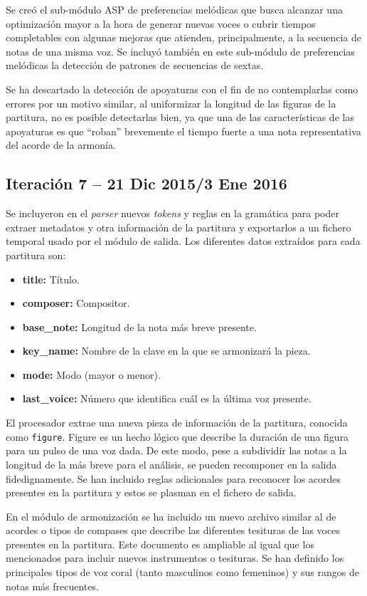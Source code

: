 Se creó el sub-módulo ASP de preferencias melódicas que busca alcanzar una optimización mayor a la hora de generar nuevas voces o cubrir tiempos completables con algunas mejoras que atienden, principalmente, a la secuencia de notas de una misma voz. Se incluyó también en este sub-módulo de preferencias melódicas la detección de patrones de secuencias de sextas.

Se ha descartado la detección de apoyaturas con el fin de no contemplarlas como errores por un motivo similar, al uniformizar la longitud de las figuras de la partitura, no es posible detectarlas bien, ya que una de las características de las apoyaturas es que ``roban'' brevemente el tiempo fuerte a una nota representativa del acorde de la armonía.

\subsection{Iteración 7 -- 21 Dic 2015/3 Ene 2016}
\label{subsec:seventh_iteration}

Se incluyeron en el \textit{parser} nuevos \textit{tokens} y reglas en la gramática para poder extraer metadatos y otra información de la partitura y exportarlos a un fichero temporal usado por el módulo de salida. Los diferentes datos extraídos para cada partitura son:
\begin{itemize}
	\item \textbf{title:} Título.
	\item \textbf{composer:} Compositor.
	\item \textbf{base\_note:} Longitud de la nota más breve presente.
	\item \textbf{key\_name:} Nombre de la clave en la que se armonizará la pieza.
	\item \textbf{mode:} Modo (mayor o menor).
	\item \textbf{last\_voice:} Número que identifica cuál es la última voz presente.
\end{itemize}

El procesador extrae una nueva pieza de información de la partitura, conocida como \texttt{figure}. Figure es un hecho lógico que describe la duración de una figura para un pulso de una voz dada. De este modo, pese a subdividir las notas a la longitud de la más breve para el análisis, se pueden recomponer en la salida fidedignamente. Se han incluido reglas adicionales para reconocer los acordes presentes en la partitura y estos se plasman en el fichero de salida.

En el módulo de armonización se ha incluido un nuevo archivo similar al de acordes o tipos de compases que describe las diferentes tesituras de las voces presentes en la partitura. Este documento es ampliable al igual que los mencionados para incluir nuevos instrumentos o tesituras. Se han definido los principales tipos de voz coral (tanto masculinos como femeninos) y sus rangos de notas más frecuentes. 


